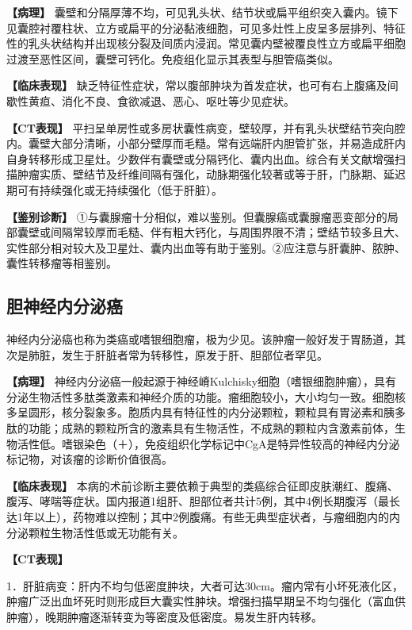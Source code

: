 \textbf{【病理】}
囊壁和分隔厚薄不均，可见乳头状、结节状或扁平组织突入囊内。镜下见囊腔衬覆柱状、立方或扁平的分泌黏液细胞，可见多灶性上皮呈多层排列、特征性的乳头状结构并出现核分裂及间质内浸润。常见囊内壁被覆良性立方或扁平细胞过渡至恶性区间，囊壁可钙化。免疫组化显示其表型与胆管癌类似。

\textbf{【临床表现】}
缺乏特征性症状，常以腹部肿块为首发症状，也可有右上腹痛及间歇性黄疸、消化不良、食欲减退、恶心、呕吐等少见症状。

\textbf{【CT表现】}
平扫呈单房性或多房状囊性病变，壁较厚，并有乳头状壁结节突向腔内。囊壁大部分清晰，小部分壁厚而毛糙。常有远端肝内胆管扩张，并易造成肝内自身转移形成卫星灶。少数伴有囊壁或分隔钙化、囊内出血。综合有关文献增强扫描肿瘤实质、壁结节及纤维间隔有强化，动脉期强化较著或等于肝，门脉期、延迟期可有持续强化或无持续强化（低于肝脏）。

\textbf{【鉴别诊断】}
①与囊腺瘤十分相似，难以鉴别。但囊腺癌或囊腺瘤恶变部分的局部囊壁或间隔常较厚而毛糙、伴有粗大钙化，与周围界限不清；壁结节较多且大、实性部分相对较大及卫星灶、囊内出血等有助于鉴别。②应注意与肝囊肿、脓肿、囊性转移瘤等相鉴别。

\subsection{胆神经内分泌癌}

神经内分泌癌也称为类癌或嗜银细胞瘤，极为少见。该肿瘤一般好发于胃肠道，其次是肺脏，发生于肝脏者常为转移性，原发于肝、胆部位者罕见。

\textbf{【病理】}
神经内分泌癌一般起源于神经嵴Kulchisky细胞（嗜银细胞肿瘤），具有分泌生物活性多肽类激素和神经介质的功能。瘤细胞较小，大小均匀一致。细胞核多呈圆形，核分裂象多。胞质内具有特征性的内分泌颗粒，颗粒具有胃泌素和胰多肽的功能；成熟的颗粒所含的激素具有生物活性，不成熟的颗粒内含激素前体，生物活性低。嗜银染色（＋），免疫组织化学标记中CgA是特异性较高的神经内分泌标记物，对该瘤的诊断价值很高。

\textbf{【临床表现】}
本病的术前诊断主要依赖于典型的类癌综合征即皮肤潮红、腹痛、腹泻、哮喘等症状。国内报道1组肝、胆部位者共计5例，其中4例长期腹泻（最长达1年以上），药物难以控制；其中2例腹痛。有些无典型症状者，与瘤细胞内的内分泌颗粒生物活性低或无功能有关。

\textbf{【CT表现】}

1．肝脏病变：肝内不均匀低密度肿块，大者可达30cm。瘤内常有小坏死液化区，肿瘤广泛出血坏死时则形成巨大囊实性肿块。增强扫描早期呈不均匀强化（富血供肿瘤），晚期肿瘤逐渐转变为等密度及低密度。易发生肝内转移。

